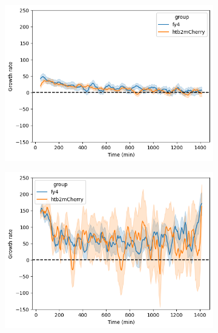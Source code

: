 \begin{figure}[htbp!]
  \centering
  \begin{subfigure}[htpb]{0.45\textwidth}
   \centering
   \includegraphics[width=\textwidth]{allstrains_31492_gr}
   \caption{
   }
   \label{fig:biology-lowglc-gr}
  \end{subfigure}%
  \begin{subfigure}[htpb]{0.45\textwidth}
   \centering
   \includegraphics[width=\textwidth]{allstrains_26643_gr}
   \caption{
   }
   \label{fig:biology-highglc-gr}
  \end{subfigure}


\end{figure}
